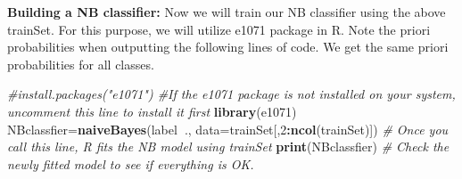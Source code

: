 \documentclass[]{article}
\newenvironment{Shaded}{\begin{snugshade}}{\end{snugshade}}
\newcommand{\CommentTok}[1]{\textcolor[rgb]{0.56,0.35,0.01}{\textit{#1}}}
\newcommand{\DataTypeTok}[1]{\textcolor[rgb]{0.13,0.29,0.53}{#1}}
\newcommand{\DecValTok}[1]{\textcolor[rgb]{0.00,0.00,0.81}{#1}}
\newcommand{\KeywordTok}[1]{\textcolor[rgb]{0.13,0.29,0.53}{\textbf{#1}}}
\newcommand{\NormalTok}[1]{#1}
\newcommand{\OperatorTok}[1]{\textcolor[rgb]{0.81,0.36,0.00}{\textbf{#1}}}
\begin{document}
\textbf{Building a NB classifier:} Now we will train our NB classiﬁer
using the above trainSet. For this purpose, we will utilize e1071
package in R. Note the priori probabilities when outputting the
following lines of code. We get the same priori probabilities for all
classes.

\begin{Shaded}
\begin{Highlighting}[]
\CommentTok{#install.packages("e1071") #If the e1071 package is not installed on your system, uncomment this line to install it first}
\KeywordTok{library}\NormalTok{(e1071)}
\NormalTok{NBclassfier=}\KeywordTok{naiveBayes}\NormalTok{(label}\OperatorTok{~}\NormalTok{., }\DataTypeTok{data=}\NormalTok{trainSet[,}\DecValTok{2}\OperatorTok{:}\KeywordTok{ncol}\NormalTok{(trainSet)]) }\CommentTok{# Once you call this line, R fits the NB model using trainSet}
\KeywordTok{print}\NormalTok{(NBclassfier) }\CommentTok{# Check the newly fitted model to see if everything is OK.}
\end{Highlighting}
\end{Shaded}
\end{document}
